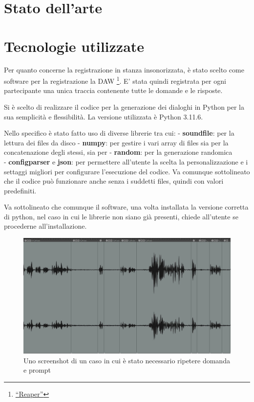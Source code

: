 \documentclass[
]{article}
\begin{document}
\section{Stato dell'arte}\label{stato-dellarte}

\section{Tecnologie utilizzate}\label{tecnologie-utilizzate}

Per quanto concerne la registrazione in stanza insonorizzata, è stato scelto come software per la registrazione la DAW \footnote{\href{https://www.reaper.fm/}{``Reaper''}}. E' stata quindi registrata per ogni partecipante una unica traccia contenente tutte le domande e le risposte.

Si è scelto di realizzare il codice per la generazione dei dialoghi in Python per la sua semplicità e flessibilità. La versione utilizzata è Python 3.11.6.

Nello specifico è stato fatto uso di diverse librerie tra cui: - \textbf{soundfile}: per la lettura dei files da disco - \textbf{numpy}: per gestire i vari array di files sia per la concatenazione degli stessi, sia per - \textbf{random}: per la generazione randomica\\
- \textbf{configparser} e \textbf{json}: per permettere all'utente la scelta la personalizzazione e i settaggi migliori per configurare l'esecuzione del codice. Va comunque sottolineato che il codice può funzionare anche senza i suddetti files, quindi con valori predefiniti.

Va sottolineato che comunque il software, una volta installata la versione corretta di python, nel caso in cui le librerie non siano già presenti, chiede all'utente se procederne all'installazione.

\begin{figure}
\centering
\includegraphics{img/1.jpg}
\caption{Uno screenshot di un caso in cui è stato necessario ripetere domanda e prompt}
\end{figure}
\end{document}
